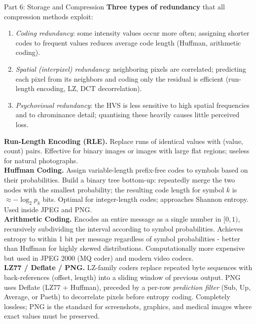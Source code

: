 \documentclass[letterpaper]{article}
\begin{document}
\begin{notes}{Part 6: Storage and Compression}
\textbf{Three types of redundancy} that all compression methods exploit:
\begin{enumerate}
    \item \emph{Coding redundancy}: some intensity values occur more often; assigning shorter codes to frequent values reduces average code length (Huffman, arithmetic coding).
    \item \emph{Spatial (interpixel) redundancy}: neighboring pixels are correlated; predicting each pixel from its neighbors and coding only the residual is efficient (run-length encoding, LZ, DCT decorrelation).
    \item \emph{Psychovisual redundancy}: the HVS is less sensitive to high spatial frequencies and to chrominance detail; quantising these heavily causes little perceived loss.
\end{enumerate}


\textbf{Run-Length Encoding (RLE).} Replace runs of identical values with (value, count) pairs. Effective for binary images or images with large flat regions; useless for natural photographs.\\

\textbf{Huffman Coding.} Assign variable-length prefix-free codes to symbols based on their probabilities. Build a binary tree bottom-up: repeatedly merge the two nodes with the smallest probability; the resulting code length for symbol $k$ is $\approx -\log_2 p_k$ bits. Optimal for integer-length codes; approaches Shannon entropy. Used inside JPEG and PNG.\\

\textbf{Arithmetic Coding.} Encodes an entire message as a single number in $[0,1)$, recursively subdividing the interval according to symbol probabilities. Achieves entropy to within 1 bit per message regardless of symbol probabilities - better than Huffman for highly skewed distributions. Computationally more expensive but used in JPEG 2000 (MQ coder) and modern video codecs.\\

\textbf{LZ77 / Deflate / PNG.} LZ-family coders replace repeated byte sequences with back-references (offset, length) into a sliding window of previous output. PNG uses Deflate (LZ77 + Huffman), preceded by a per-row \emph{prediction filter} (Sub, Up, Average, or Paeth) to decorrelate pixels before entropy coding. Completely lossless; PNG is the standard for screenshots, graphics, and medical images where exact values must be preserved.


\end{notes}
\end{document}
